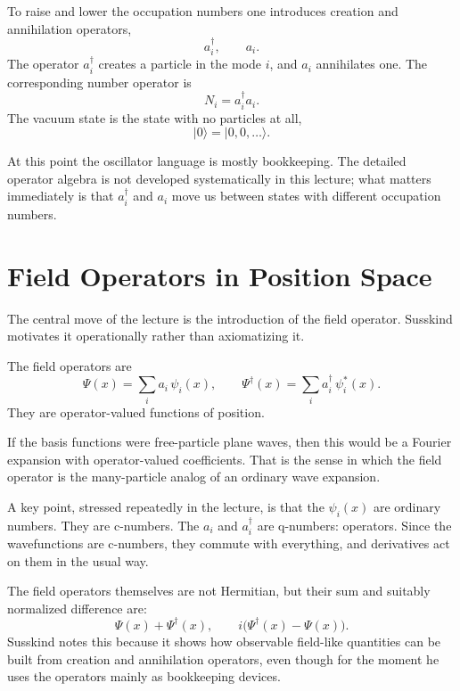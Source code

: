 To raise and lower the occupation numbers one introduces creation and annihilation operators,
\begin{equation}
a_i^\dagger,\qquad a_i.
\end{equation}
The operator $a_i^\dagger$ creates a particle in the mode $i$, and $a_i$ annihilates one. The corresponding number operator is
\begin{equation}
N_i=a_i^\dagger a_i.
\end{equation}
The vacuum state is the state with no particles at all,
\begin{equation}
|0\rangle = |0,0,\ldots\rangle.
\end{equation}

At this point the oscillator language is mostly bookkeeping. The detailed operator algebra is not developed systematically in this lecture; what matters immediately is that $a_i^\dagger$ and $a_i$ move us between states with different occupation numbers.

\section{Field Operators in Position Space}

The central move of the lecture is the introduction of the field operator. Susskind motivates it operationally rather than axiomatizing it.

\begin{definition}
The field operators are
\begin{equation}
\Psi(x)=\sum_i a_i\,\psi_i(x),
\qquad
\Psi^\dagger(x)=\sum_i a_i^\dagger\,\psi_i^*(x).
\end{equation}
They are operator-valued functions of position.
\end{definition}

If the basis functions were free-particle plane waves, then this would be a Fourier expansion with operator-valued coefficients. That is the sense in which the field operator is the many-particle analog of an ordinary wave expansion.

A key point, stressed repeatedly in the lecture, is that the $\psi_i(x)$ are ordinary numbers. They are c-numbers. The $a_i$ and $a_i^\dagger$ are q-numbers: operators. Since the wavefunctions are c-numbers, they commute with everything, and derivatives act on them in the usual way.

The field operators themselves are not Hermitian, but their sum and suitably normalized difference are:
\begin{equation}
\Psi(x)+\Psi^\dagger(x),
\qquad
i\bigl(\Psi^\dagger(x)-\Psi(x)\bigr).
\end{equation}
Susskind notes this because it shows how observable field-like quantities can be built from creation and annihilation operators, even though for the moment he uses the operators mainly as bookkeeping devices.

